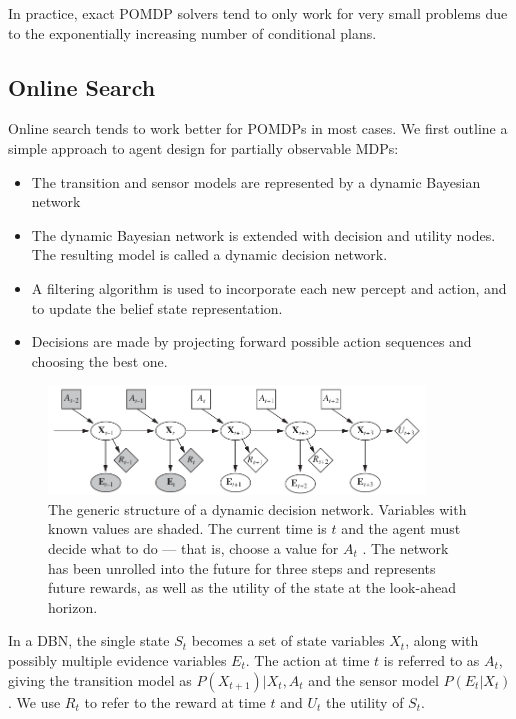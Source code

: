 \documentclass[11pt]{article}
\begin{document}
In practice, exact POMDP solvers tend to only work for very small problems due to the exponentially increasing number of conditional plans.

\subsection{Online Search}

Online search tends to work better for POMDPs in most cases. We first outline a simple approach to agent design for partially observable MDPs:

\begin{itemize}
    \item The transition and sensor models are represented by a dynamic Bayesian network
    \item The dynamic Bayesian network is extended with decision and utility nodes. The resulting model is called a dynamic decision network.
    \item A filtering algorithm is used to incorporate each new percept and action, and to update the belief state representation. 
    \item Decisions are made by projecting forward possible action sequences and choosing the best one.
\end{itemize}

\begin{figure}[!htb]
    \centering
    \includegraphics[width=10cm]{images/dynamic-decision-network.png}
    \caption{The generic structure of a dynamic decision network. Variables with known values are shaded. The current time is $t$ and the agent must decide what to do --- that is, choose a value for $A_t$ . The network has been unrolled into the future for three steps and represents future rewards, as well as the utility of the state at the look-ahead horizon.}
\end{figure}

In a DBN, the single state $S_t$ becomes a set of state variables $X_t$, along with possibly multiple evidence variables $E_t$. The action at time $t$ is referred to as $A_t$, giving the transition model as $P(X_{t+1})|X_t, A_t$ and the sensor model $P(E_t|X_t)$. We use $R_t$ to refer to the reward at time $t$ and $U_t$ the utility of $S_t$.\\
\end{document}
